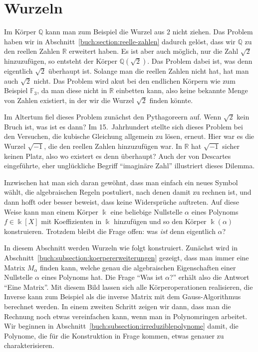 %
%
%
\section{Wurzeln
\label{buch:section:wurzeln}}
Im Körper $\mathbb{Q}$ kann man zum Beispiel die Wurzel aus $2$ nicht 
ziehen.
Das Problem haben wir in Abschnitt~\ref{buch:section:reelle-zahlen}
dadurch gelöst, dass wir $\mathbb{Q}$ zu den reellen Zahlen $\mathbb{R}$
erweitert haben.
Es ist aber auch möglich, nur die Zahl $\sqrt{2}$ hinzuzufügen,
so entsteht der Körper $\mathbb{Q}(\sqrt{2})$.
Das Problem dabei ist, was denn eigentlich $\sqrt{2}$ überhaupt ist.
Solange man die reellen Zahlen nicht hat, hat man auch $\sqrt{2}$ nicht.
Das Problem wird akut bei den endlichen Körpern wie zum Beispiel
$\mathbb{F}_3$,
da man diese nicht in $\mathbb{R}$ einbetten kann, also keine
bekannte Menge von Zahlen existiert, in der wir die Wurzel $\sqrt{2}$
finden könnte.

Im Altertum fiel dieses Problem zunächst den Pythagoreern auf.
Wenn $\sqrt{2}$ kein Bruch ist, was ist es dann?
Im 15.~Jahrhundert stellte sich dieses Problem bei den Versuchen, die
kubische Gleichung allgemein zu lösen, erneut.
Hier war es die Wurzel $\sqrt{-1}$, die den reellen Zahlen hinzuzufügen
war.
In $\mathbb{R}$ hat $\sqrt{-1}$ sicher keinen Platz, also wo existert
es denn überhaupt?
Auch der von Descartes eingeführte, eher unglückliche Begriff
``imaginäre Zahl'' illustriert dieses Dilemma.

Inzwischen hat man sich daran gewöhnt, dass man einfach ein neues Symbol
wählt, die algebraischen Regeln postuliert, nach denen damit zu rechnen
ist, und dann hofft oder besser beweist, dass keine Widersprüche auftreten.
Auf diese Weise kann man einem Körper $\Bbbk$ eine beliebige 
Nullstelle $\alpha$ eines Polynoms $f\in\Bbbk[X]$ mit Koeffizienten
in $\Bbbk$ hinzufügen und so den Körper $\Bbbk(\alpha)$ konstruieren.
Trotzdem bleibt die Frage offen: was {\em ist} denn eigentlich $\alpha$?

In diesem Abschnitt werden Wurzeln wie folgt konstruiert.
Zunächst wird in Abschnitt~\ref{buch:subsection:koerpererweiterungen}
gezeigt, dass man immer eine Matrix $M_\alpha$ finden kann, welche
genau die algebraischen Eigenschaften einer Nullstelle $\alpha$ eines
Polynoms hat.
Die Frage ``Was ist $\alpha$?'' erhält also die Antwort ``Eine Matrix''.
Mit diesem Bild lassen sich alle Körperoperationen realisieren, die
Inverse kann zum Beispiel als die inverse Matrix mit dem
Gauss-Algorithmus berechnet werden.
In einem zweiten Schritt zeigen wir dann, dass man die Rechnung noch
etwas vereinfachen kann, wenn man in Polynomringen arbeitet.
Wir beginnen in Abschnitt~\ref{buch:subsection:irreduziblepolynome}
damit, die Polynome, die für die Konstruktion in Frage kommen, etwas
genauer zu charakterisieren.

